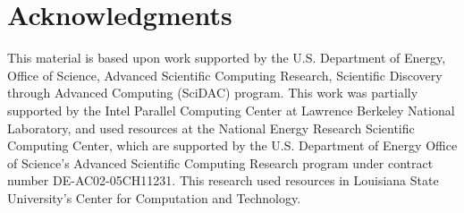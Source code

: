 \documentclass[conference]{IEEEtran}
\begin{document}



\section*{Acknowledgments}

This material is based upon work supported by the U.S. Department of Energy, Office of Science, Advanced Scientific Computing Research, Scientific Discovery through Advanced Computing (SciDAC) program.
This work was partially supported by the Intel Parallel Computing Center at
Lawrence Berkeley National Laboratory,
and used resources at the National Energy Research Scientific Computing Center, which are supported by the U.S. Department of Energy Office of Science's Advanced Scientific Computing Research program under contract number DE-AC02-05CH11231.  
This research used resources in Louisiana State University's Center for Computation and Technology. 






% 
\end{document}
